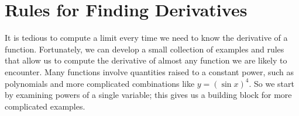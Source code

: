 \chapter{Rules for Finding Derivatives}

It is tedious to compute a limit every time we need to know the
derivative of a function. Fortunately, we can develop a small
collection of examples and rules that allow us to compute the
derivative of almost any function we are likely to encounter. Many
functions involve quantities raised to a constant power, such as
polynomials and more complicated combinations like $y=(\sin x)^4$. So
we start by examining powers of a single variable; this gives us a
building block for more complicated examples.






